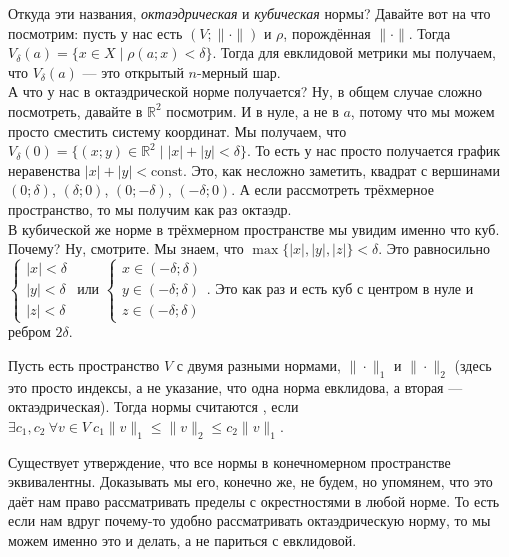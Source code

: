 \documentclass{article}
\begin{document}
\begin{itemize}
\begin{Example}
        \end{Example}
        \begin{Comment}
            Откуда эти названия, \textit{октаэдрическая} и \textit{кубическая} нормы? Давайте вот на что посмотрим: пусть у нас есть $(V;\|\cdot\|)$ и $\rho$, порождённая $\|\cdot\|$. Тогда $V_\delta(a)=\{x\in X\mid\rho(a;x)<\delta\}$. Тогда для евклидовой метрики мы получаем, что $V_\delta(a)$ --- это открытый $n$-мерный шар.\\
            А что у нас в октаэдрической норме получается? Ну, в общем случае сложно посмотреть, давайте в $\mathbb R^2$ посмотрим. И в нуле, а не в $a$, потому что мы можем просто сместить систему координат. Мы получаем, что $V_\delta(0)=\{(x;y)\in\mathbb R^2\mid|x|+|y|<\delta\}$. То есть у нас просто получается график неравенства $|x|+|y|<\mathrm{const}$. Это, как несложно заметить, квадрат с вершинами $(0;\delta)$, $(\delta;0)$, $(0;-\delta)$, $(-\delta;0)$. А если рассмотреть трёхмерное пространство, то мы получим как раз октаэдр.\\
            В кубической же норме в трёхмерном пространстве мы увидим именно что куб. Почему? Ну, смотрите. Мы знаем, что $\max\{|x|,|y|,|z|\}<\delta$. Это равносильно $\left\{\begin{aligned}
                |x|<\delta\\
                |y|<\delta\\
                |z|<\delta
            \end{aligned}\right.$ или $\left\{\begin{aligned}
                x\in(-\delta;\delta)\\
                y\in(-\delta;\delta)\\
                z\in(-\delta;\delta)
            \end{aligned}\right.$. Это как раз и есть куб с центром в нуле и ребром $2\delta$.
        \end{Comment}
        \dfn Пусть есть пространство $V$ с двумя разными нормами, $\|\cdot\|_1$ и $\|\cdot\|_2$ (здесь это просто индексы, а не указание, что одна норма евклидова, а вторая --- октаэдрическая). Тогда нормы считаются , если $\exists c_1,c_2~\forall v\in V~c_1\|v\|_1\leqslant\|v\|_2\leqslant c_2\|v\|_1$.
        \begin{Comment}
            Существует утверждение, что все нормы в конечномерном пространстве эквивалентны. Доказывать мы его, конечно же, не будем, но упомянем, что это даёт нам право рассматривать пределы с окрестностями в любой норме. То есть если нам вдруг почему-то удобно рассматривать октаэдрическую норму, то мы можем именно это и делать, а не париться с евклидовой.
        \end{Comment}
    \end{itemize}
\end{document}

